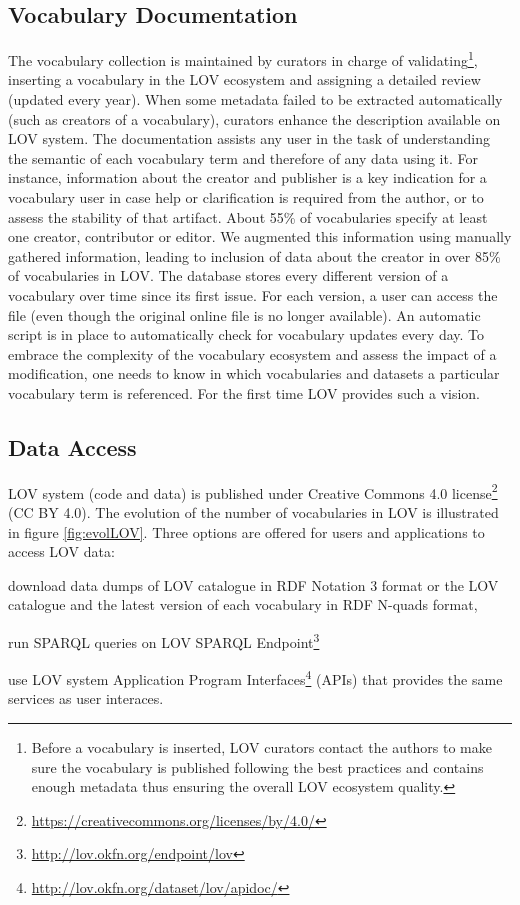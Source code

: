 \documentclass{iosart2c}
\begin{document}
	\subsection{Vocabulary Documentation} 
	The vocabulary collection is maintained by curators in charge of validating\footnote{Before a vocabulary is inserted, LOV curators contact the authors to make sure the vocabulary is published following the best practices and contains enough metadata thus ensuring the overall LOV ecosystem quality.}, inserting a vocabulary in the LOV ecosystem and assigning a detailed review (updated every year). When some metadata failed to be extracted automatically (such as creators of a vocabulary), curators enhance the description available on LOV system. The documentation assists any user in the task of understanding the semantic of each vocabulary term and therefore of any data using it. For instance, information about the creator and publisher is a key indication for a vocabulary user in case help or clarification is required from the author, or to assess the stability of that artifact. About 55\% of vocabularies specify at least one creator, contributor or editor. We augmented this information using manually gathered information, leading to inclusion of data about the creator in over 85\% of vocabularies in LOV. The database stores every different version of a vocabulary over time since its first issue. For each version, a user can access the file (even though the original online file is no longer available). An automatic script is in place to automatically check for vocabulary updates every day. To embrace the complexity of the vocabulary ecosystem and assess the impact of a modification, one needs to know in which vocabularies and datasets a particular vocabulary term is referenced. For the first time LOV provides such a vision. 


	\subsection{Data Access}
	LOV system (code and data) is published under Creative Commons 4.0 license\footnote{\url{https://creativecommons.org/licenses/by/4.0/}} (CC BY 4.0). The evolution of the number of vocabularies in LOV is illustrated in figure \ref{fig:evolLOV}. Three options are offered for users and applications to access LOV data:
		\begin{inparaenum}[1)] 
			\item download data dumps of LOV catalogue in RDF Notation 3 format or the LOV catalogue and the latest version of each vocabulary in RDF N-quads format,
			\item run SPARQL queries on LOV SPARQL Endpoint\footnote{\url{http://lov.okfn.org/endpoint/lov}}
			\item use LOV system Application Program Interfaces\footnote{\url{http://lov.okfn.org/dataset/lov/apidoc/}} (APIs) that provides the same services as user interaces.
		\end{inparaenum}
\end{document}
